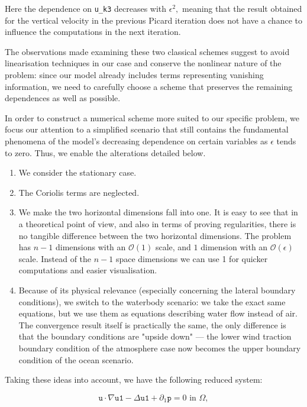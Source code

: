 \documentclass[12pt]{report}
\numberwithin{theorem}{chapter}
\numberwithin{corollary}{chapter}
\numberwithin{lemma}{chapter}
\numberwithin{remark}{chapter}
\numberwithin{definition}{chapter}
\numberwithin{prop}{chapter}
\begin{document}
Here the dependence on \texttt{u\_k3} decreases with $\epsilon^2,$ meaning that the result obtained for the vertical velocity in the previous Picard iteration does not have a chance to influence the computations in the next iteration.

The observations made examining these two classical schemes suggest to avoid linearisation techniques in our case and conserve the nonlinear nature of the problem: since our model already includes terms representing vanishing information, we need to carefully choose a scheme that preserves the remaining dependences as well as possible.

In order to construct a numerical scheme more suited to our specific problem, we focus our attention to a simplified scenario that still contains the fundamental phenomena of the model's decreasing dependence on certain variables as $\epsilon$ tends to zero. Thus, we enable the alterations detailed below.

\begin{enumerate}
  \item We consider the stationary case.
  \item The Coriolis terms are neglected.
  \item We make the two horizontal dimensions fall into one. It is easy to see that in a theoretical point of view, and also in terms of proving regularities, there is no tangible difference between the two horizontal dimensions. The problem has $n-1$ dimensions with an $\mathcal{O}(1)$ scale, and $1$ dimension with an $\mathcal{O}(\epsilon)$ scale. Instead of the $n-1$ space dimensions we can use 1 for quicker computations and easier visualisation.
  \item Because of its physical relevance (especially concerning the lateral boundary conditions), we switch to the waterbody scenario: we take the exact same equations, but we use them as equations describing water flow instead of air. The convergence result itself is practically the same, the only difference is that the boundary conditions are "upside down" --- the lower wind traction boundary condition of the atmosphere case now becomes the upper boundary condition of the ocean scenario.
\end{enumerate}

Taking these ideas into account, we have the following reduced system:

\begin{equation} \label{fenics_strong_horizontal}
  \mathbf{\texttt{u}} \cdot \nabla \texttt{u1} - \Delta \texttt{u1} + \partial_1 \texttt{p} = 0 \text{ in } \Omega,
\end{equation}
    
\end{document}
